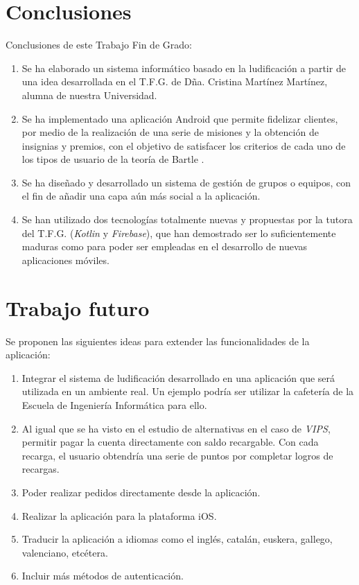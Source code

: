 \documentclass[twoside]{report}
\begin{document}
\section{Conclusiones}

Conclusiones de este Trabajo Fin de Grado:
\begin{enumerate}

\item Se ha elaborado un sistema informático basado en la ludificación a partir de una idea desarrollada en el T.F.G. de Dña. Cristina Martínez Martínez, alumna de nuestra Universidad.

\item Se ha implementado una aplicación Android que permite fidelizar clientes, por medio de la realización de una serie de misiones y la obtención de insignias y premios, con el objetivo de satisfacer los criterios de cada uno de los tipos de usuario de la teoría de Bartle \cite{iebsctj}.

\item Se ha diseñado y desarrollado un sistema de gestión de grupos o equipos, con el fin de añadir una capa aún más social a la aplicación.

\item Se han utilizado dos tecnologías totalmente nuevas y propuestas por la tutora del T.F.G. (\textit{Kotlin} y \textit{Firebase}), que han demostrado ser lo suficientemente maduras como para poder ser empleadas en el desarrollo de nuevas aplicaciones móviles.
\end{enumerate}

\section{Trabajo futuro}

Se proponen las siguientes ideas para extender las funcionalidades de la aplicación:

\begin{enumerate}
\item Integrar el sistema de ludificación desarrollado en una aplicación que será utilizada en un ambiente real. Un ejemplo podría ser utilizar la cafetería de la Escuela de Ingeniería Informática para ello.

\item Al igual que se ha visto en el estudio de alternativas en el caso de \textit{VIPS}, permitir pagar la cuenta directamente con saldo recargable. Con cada recarga, el usuario obtendría una serie de puntos por completar logros de recargas.

\item Poder realizar pedidos directamente desde la aplicación.

\item Realizar la aplicación para la plataforma iOS.

\item Traducir la aplicación a idiomas como el inglés, catalán, euskera, gallego, valenciano, etcétera.

\item Incluir más métodos de autenticación.
\end{enumerate}
\end{document}
